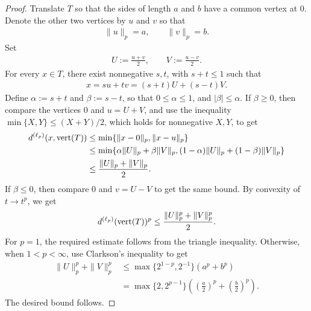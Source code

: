 \documentclass[11pt]{article}
\begin{document}
\begin{proof}
    Translate $T$ so that the sides of length $a$ and $b$ have a common vertex at $0$. Denote the other two vertices by $u$ and $v$ so that
    \begin{align*}
        \|u\|_p=a,\qquad \|v\|_p=b.
    \end{align*}
    Set
    \begin{align*}
        U:=\frac{u+v}{2},\qquad V:=\frac{u-v}{2}.
    \end{align*}
    For every $x\in T$, there exist nonnegative $s,t$, with $s+t\leq 1$ such that
    \begin{align*}
        x=su+tv=(s+t)U+(s-t)V.
    \end{align*}
    Define $\alpha:=s+t$ and $\beta:=s-t$, so that $0\leq \alpha\leq 1$, and $|\beta|\leq \alpha$. If $\beta\geq 0$, then compare the vertices $0$ and $u=U+V$, and use the inequality $\min\{X,Y\}\leq (X+Y)/2$, which holds for nonnegative $X,Y$, to get
    \begin{align*}
        d^{(\ell_p)}(x,\textup{vert}(T))&\leq \min\{\|x-0\|_p,\|x-u\|_p\}\\
        &\leq \min\{\alpha \|U\|_p+\beta\|V\|_p,(1-\alpha)\|U\|_p+(1-\beta)\|V\|_p\}\\
        &\leq \frac{\|U\|_p+\|V\|_p}{2}.
    \end{align*}
    If $\beta\leq 0$, then compare $0$ and $v=U-V$ to get the same bound. By convexity of $t\to t^p$, we get
    \begin{align*}
        d^{(\ell_p)}(\textup{vert}(T))^p\leq \frac{\|U\|_p^p+\|V\|_p^p}{2}.
    \end{align*}
    For $p=1$, the required estimate follows from the triangle inequality. Otherwise, when $1<p<\infty$, use Clarkson's inequality \cite[Theorem 2]{clarkson1} to get 
    \begin{align*}
        \|U\|_p^p+\|V\|_p^p&\leq \max\{2^{1-p},2^{-1}\}(a^p+b^p)\\
        &=\max\{2,2^{p-1}\}\left(\left(\frac{a}{2}\right)^p+\left(\frac{b}{2}\right)^p\right).
    \end{align*}
    The desired bound follows.
\end{proof}
\end{document}
